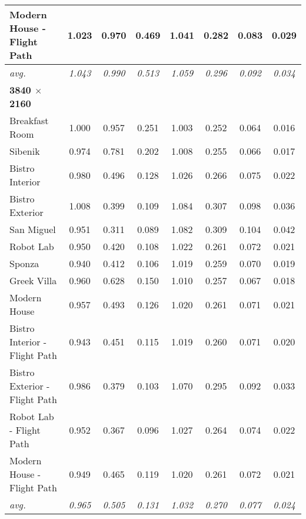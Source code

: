 \begin{table*}
\begin{tabular}{l ccc|cccc}
Modern House - Flight Path    & 1.023          & 0.970          & 0.469          & 1.041          & 0.282          & 0.083          & 0.029            \\
\hline
\textit{avg.}                 & \textit{1.043} & \textit{0.990} & \textit{0.513} & \textit{1.059} & \textit{0.296} & \textit{0.092} & \textit{0.034}   \\
\hline
\textbf{3840 $\times$ 2160}   & & & & & & & \\
Breakfast Room                & 1.000          & 0.957          & 0.251          & 1.003          & 0.252          & 0.064          & 0.016            \\
Sibenik                       & 0.974          & 0.781          & 0.202          & 1.008          & 0.255          & 0.066          & 0.017            \\
Bistro Interior               & 0.980          & 0.496          & 0.128          & 1.026          & 0.266          & 0.075          & 0.022            \\
Bistro Exterior               & 1.008          & 0.399          & 0.109          & 1.084          & 0.307          & 0.098          & 0.036            \\
San Miguel                    & 0.951          & 0.311          & 0.089          & 1.082          & 0.309          & 0.104          & 0.042            \\
Robot Lab                     & 0.950          & 0.420          & 0.108          & 1.022          & 0.261          & 0.072          & 0.021            \\
Sponza                        & 0.940          & 0.412          & 0.106          & 1.019          & 0.259          & 0.070          & 0.019            \\
Greek Villa                   & 0.960          & 0.628          & 0.150          & 1.010          & 0.257          & 0.067          & 0.018            \\
Modern House                  & 0.957          & 0.493          & 0.126          & 1.020          & 0.261          & 0.071          & 0.021            \\
Bistro Interior - Flight Path & 0.943          & 0.451          & 0.115          & 1.019          & 0.260          & 0.071          & 0.020            \\
Bistro Exterior - Flight Path & 0.986          & 0.379          & 0.103          & 1.070          & 0.295          & 0.092          & 0.033            \\
Robot Lab - Flight Path       & 0.952          & 0.367          & 0.096          & 1.027          & 0.264          & 0.074          & 0.022            \\
Modern House - Flight Path    & 0.949          & 0.465          & 0.119          & 1.020          & 0.261          & 0.072          & 0.021            \\
\hline
\textit{avg.}                 & \textit{0.965} & \textit{0.505} & \textit{0.131} & \textit{1.032} & \textit{0.270} & \textit{0.077} & \textit{0.024}  
\end{tabular}


\end{table*}
